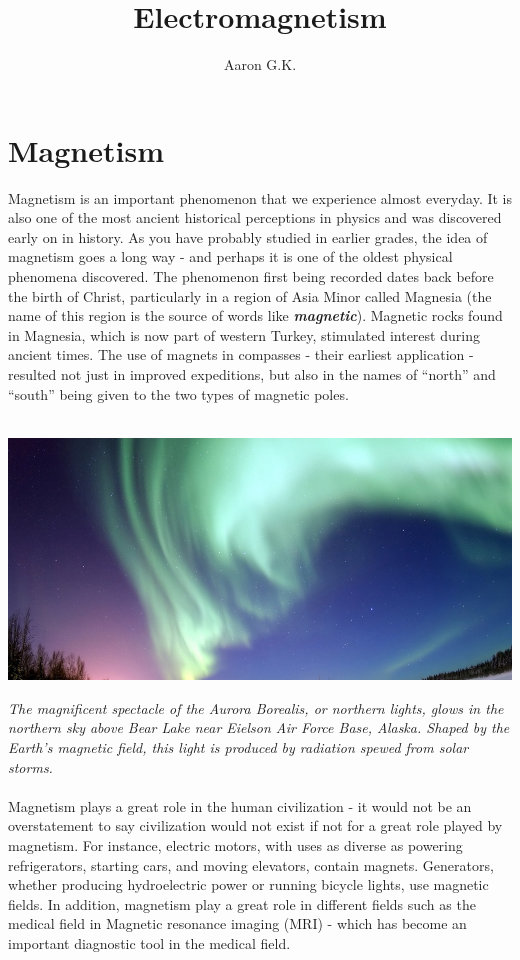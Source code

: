 \documentclass[9pt]{exam}
\title{Electromagnetism}
\author{Aaron G.K.}
\begin{document}
	\maketitle
	\section*{Magnetism}
	Magnetism is an important phenomenon that we experience almost everyday. It is also one of the most ancient historical perceptions in physics and was discovered early on in history. As you have probably studied in earlier grades, the idea of magnetism goes a long way - and perhaps it is one of the oldest physical phenomena discovered. The phenomenon first being recorded dates back before the birth of Christ, particularly in a region of Asia Minor called Magnesia (the name of this region is the source of words like \textit{\textbf{magnetic}}). Magnetic rocks found in Magnesia, which is now part of western Turkey, stimulated interest during ancient times. The use of magnets in compasses - their earliest application - resulted not just in improved expeditions, but also in the names of “north” and “south” being given to the two types of magnetic poles. \\ \\
	\begin{center}
		\includegraphics*[scale=0.5]{aurora_borealis}
	\end{center}
	\textit{The magnificent spectacle of the Aurora Borealis, or northern lights, glows in the northern sky above Bear Lake near Eielson Air Force Base, Alaska. Shaped by the Earth’s magnetic field, this light is produced by radiation spewed from solar storms.} \\ \\
	Magnetism plays a great role in the human civilization - it would not be an overstatement to say civilization would not exist if not for a great role played by magnetism. For instance, electric motors, with uses as diverse as powering refrigerators, starting cars, and moving elevators, contain magnets. Generators, whether producing hydroelectric power or running bicycle lights, use magnetic fields. In addition, magnetism play a great role in different fields such as the medical field in Magnetic resonance imaging (MRI) - which has become an important diagnostic tool in the medical field.
\end{document}
